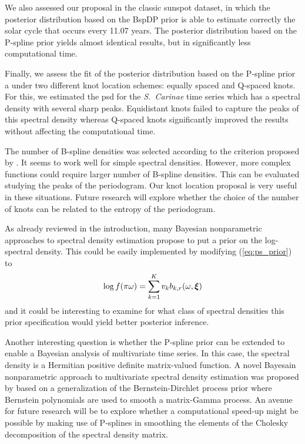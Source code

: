 \documentclass[twocolumn,final]{svjour3}
\newcommand{\bm}[1]{\mbox{\boldmath $#1$}}
\begin{document}
We also assessed our proposal in the classic sunspot dataset, in which the posterior distribution based on the BspDP prior %
 is able to estimate correctly the solar cycle that occurs every 11.07 years.  The posterior distribution based on the P-spline prior yields almost identical results, but in  significantly  less computational time.  

Finally, we assess the fit of the posterior distribution based on the P-spline prior a under two different knot location schemes: equally spaced and Q-spaced knots.  For this, we estimated the psd for the {\it S.\ Carinae} time series which has a spectral density with several sharp peaks.  Equidistant knots failed to capture the peaks of this spectral density whereas Q-spaced knots significantly improved  the results without affecting the computational time.

The number of B-spline densities was selected according to the criterion proposed by \cite{Ruppert2002}.  It seems to work well for simple spectral densities.  However, more complex functions could require larger number of B-spline densities.  This can be evaluated studying the peaks of the periodogram.  Our knot location proposal is very useful in these situations.  Future research will explore whether the choice of the number of knots can be related to the entropy of the periodogram.

As already reviewed in the introduction, many Bayesian nonparametric approaches to spectral density estimation propose to put a prior on the log-spectral density. This could be easily implemented by modifying (\ref{eq:ps_prior}) to
 \[ \log f(\pi \omega)=\sum_{k=1}^K v_k b_{k,r}(\omega,{\bm \xi})\]
and it could be interesting to examine for what class of spectral densities this prior specification would yield better posterior inference. 

Another interesting question is whether the P-spline prior can be extended to enable a Bayesian analysis of multivariate time series. In this case, the spectral density is a 
Hermitian positive definite  matrix-valued function. A novel Bayesain nonparametric approach to multivariate spectral density estimation was proposed by
\cite{Meier2020} based on a generalization of the Bernstein-Dirchlet process prior where Bernstein polynomials are used to smooth a matrix-Gamma process.
An avenue for future research will be to explore whether a computational speed-up might be possible by making use of P-splines in smoothing the elements of the
Cholesky decomposition of the spectral density matrix.
\end{document}

